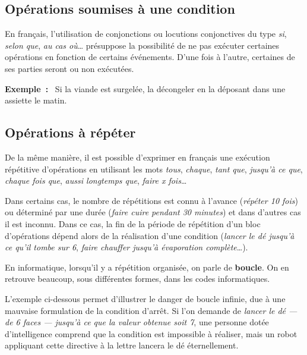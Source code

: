 		\subsection{Opérations soumises à une condition}
		
			En français, 
			l’utilisation de conjonctions ou locutions conjonctives 
			du type \textit{si}, \textit{selon que}, \textit{au cas où}\dots{}
			présuppose la possibilité 
			de ne pas exécuter certaines opérations 
			en fonction de certains événements. 
			D’une fois à l’autre, 
			certaines de ses parties seront ou non exécutées.
			
			\textbf{Exemple~:}~
			Si la viande est surgelée, la décongeler en la déposant dans une
			assiette le matin.

	
		\subsection{Opérations à répéter}
		
			De la même manière, 
			il est possible d’exprimer en français une exécution
			répétitive d’opérations en utilisant les mots \textit{tous},
			\textit{chaque}, \textit{tant que}, \textit{jusqu’à ce que},
			\textit{chaque fois que}, \textit{aussi longtemps que}, 
			\textit{faire x fois}\dots 
			
			Dans certains cas, 
			le nombre de répétitions est connu à l’avance
			(\textit{répéter 10 fois}) 
			ou déterminé par une durée 
			(\textit{faire cuire pendant 30 minutes}) 
			et dans d’autres cas il est inconnu.
			Dans ce cas, la fin de la période de répétition 
			d’un bloc d’opérations dépend alors 
			de la réalisation d’une condition 
			(\textit{lancer le dé jusqu’à ce qu’il tombe sur 6}, 
			\textit{faire chauffer jusqu’à évaporation complète}\dots). 
			
			En informatique, lorsqu'il y a répétition organisée, on parle de 
			\textbf{boucle}. On en retrouve beaucoup, sous différentes formes,
			dans les codes informatiques.
			
			L'exemple ci-dessous permet d'illustrer le danger de boucle infinie,
			due à une mauvaise formulation de la condition d’arrêt.  Si l'on
			demande de \textit{lancer le dé — de 6 faces — jusqu’à ce que la
			valeur obtenue soit 7}, une personne dotée d’intelligence comprend
			que la condition est impossible à réaliser, mais un robot appliquant
			cette directive à la lettre lancera le dé éternellement. 
	
